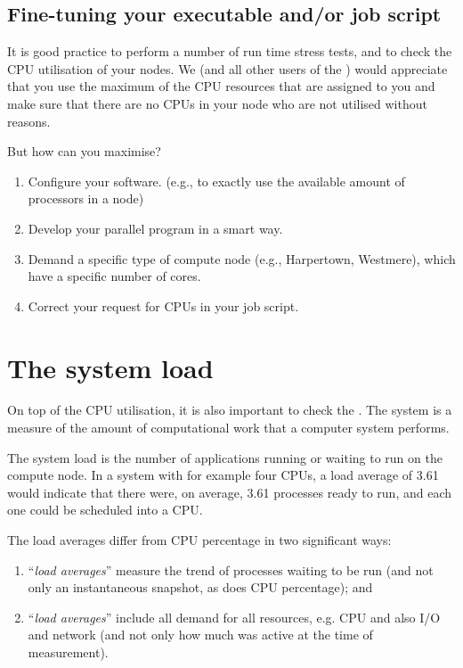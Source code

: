 \subsection{Fine-tuning your executable and/or job script}

It is good practice to perform a number of run time stress tests, and to check
the CPU utilisation of your nodes. We (and all other users of the \hpc) would
appreciate that you use the maximum of the CPU resources that are assigned to
you and make sure that there are no CPUs in your node who are not utilised
without reasons.

But how can you maximise?

\begin{enumerate}
\item  Configure your software. (e.g., to exactly use the available amount of processors in a node)
\item  Develop your parallel program in a smart way.
\item  Demand a specific type of compute node (e.g., Harpertown, Westmere), which have a specific number of cores.
\item  Correct your request for CPUs in your job script.
\end{enumerate}

\section{The system load}

On top of the CPU utilisation, it is also important to check the .  The system  is a measure of the amount of computational
work that a computer system performs.

The system load is the number of applications running or waiting to run on the
compute node.  In a system with for example four CPUs, a load average of 3.61
would indicate that there were, on average, 3.61 processes ready to run, and
each one could be scheduled into a CPU.

The load averages differ from CPU percentage in two significant ways:

\begin{enumerate}
\item  ``\emph{load averages}'' measure the trend of processes waiting to be run (and not only an instantaneous snapshot, as does CPU percentage); and
\item  ``\emph{load averages}'' include all demand for all resources, e.g. CPU and also I/O and network (and not only how much was active at the time of measurement).
\end{enumerate}

